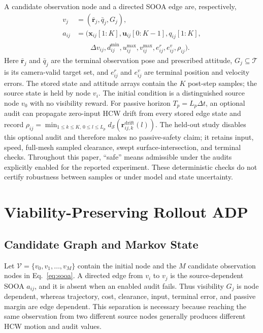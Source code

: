 \documentclass{IEEEtaes}
\newcommand{\dt}{\Delta t}
\theoremstyle{remark}
\theoremstyle{plain}
\begin{document}
A candidate observation node and a directed SOOA edge are, respectively,
\begin{equation}
  \begin{aligned}
  v_j&=(\bar{\mathbf r}_j,\bar q_j,G_j),\\
  a_{ij}&=\bigl(\mathbf x_{ij}[1{:}K],\mathbf u_{ij}[0{:}K-1],q_{ij}[1{:}K],\\
  &\qquad \Delta v_{ij},d_{ij}^{\min},u_{ij}^{\max},v_{ij}^{\max},e_{ij}^{r},e_{ij}^{v},\rho_{ij}\bigr).
  \end{aligned}
  \label{eq:sooa}
\end{equation}
Here $\bar{\mathbf r}_j$ and $\bar q_j$ are the terminal observation pose and prescribed attitude, $G_j\subseteq\mathcal T$ is its camera-valid target set, and $e_{ij}^{r}$ and $e_{ij}^{v}$ are terminal position and velocity errors. The stored state and attitude arrays contain the $K$ post-step samples; the source state is held by node $v_i$. The initial condition is a distinguished source node $v_0$ with no visibility reward. For passive horizon $T_p=L_p\dt$, an optional audit can propagate zero-input HCW drift from every stored edge state and record $\rho_{ij}=\min_{1\le k\le K,\,0\le l\le L_p}d_{\mathcal S}(\mathbf r_{ij,k}^{\mathrm{drift}}(l))$. The held-out study disables this optional audit and therefore makes no passive-safety claim; it retains input, speed, full-mesh sampled clearance, swept surface-intersection, and terminal checks. Throughout this paper, ``safe'' means admissible under the audits explicitly enabled for the reported experiment. These deterministic checks do not certify robustness between samples or under model and state uncertainty.

\section{Viability-Preserving Rollout ADP}
\label{sec:algorithm}

\subsection{Candidate Graph and Markov State}

Let $\mathcal V=\{v_0,v_1,\ldots,v_M\}$ contain the initial node and the $M$ candidate observation nodes in Eq.~\eqref{eq:sooa}. A directed edge from $v_i$ to $v_j$ is the source-dependent SOOA $a_{ij}$, and it is absent when an enabled audit fails. Thus visibility $G_j$ is node dependent, whereas trajectory, cost, clearance, input, terminal error, and passive margin are edge dependent. This separation is necessary because reaching the same observation from two different source nodes generally produces different HCW motion and audit values.
\end{document}
